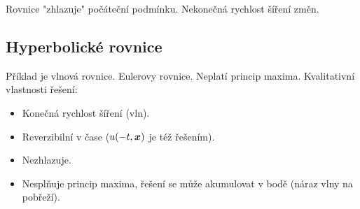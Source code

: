  Rovnice "zhlazuje" počáteční podmínku.
Nekonečná rychlost šíření změn.
\subsection{Hyperbolické rovnice}

Příklad je vlnová rovnice. 
Eulerovy rovnice. Neplatí princip maxima. 
Kvalitativní vlastnosti řešení:
\begin{itemize}
 \item Konečná rychlost šíření (vln).
 \item Reverzibilní v čase ($u(-t, \mathbf{\boldsymbol{x}} )$ je též řešením).
 \item Nezhlazuje.
 \item Nesplňuje princip maxima, řešení se může akumulovat v bodě (náraz vlny na pobřeží).
\end{itemize}


